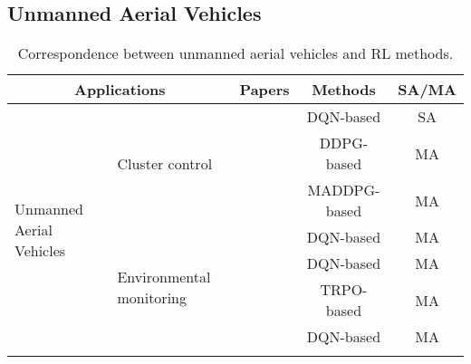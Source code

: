 \documentclass[acmsmall]{acmart}
\begin{document}
\subsection{Unmanned Aerial Vehicles}
\begin{table}[]
\centering
\caption{Correspondence between unmanned aerial vehicles and RL methods.}
\label{uav}
\begin{tabularx}{\textwidth}{|XX|c|c|c|}
\hline
\multicolumn{2}{|c|}{Applications}                                                                                & Papers                                                           & Methods                    & SA/MA \\ \hline
\multicolumn{1}{|X|}{\multirow{9}{=}{\centering Unmanned Aerial Vehicles}} & \multirow{3}{=}{\centering Cluster control}                & \cite{maciel2019online}                                          & DQN-based \cite{dqn}       & SA       \\ \cline{3-5} 
\multicolumn{1}{|X|}{}                                          &                                                 & \cite{9001167}                                                   & DDPG-based \cite{ddpg}     & MA       \\ \cline{3-5} 
\multicolumn{1}{|X|}{}                                          &                                                 & \cite{9209079}                                                   & MADDPG-based \cite{maddpg} & MA       \\ \cline{2-5} 
\multicolumn{1}{|X|}{}                                          & \multirow{4}{=}{\centering Environmental   monitoring}     & \cite{journals/corr/abs-1803-07250}                              & DQN-based \cite{dqn}       & MA       \\ \cline{3-5} 
\multicolumn{1}{|X|}{}                                          &                                                 & \cite{julian2019distributed}                                     & DQN-based \cite{dqn}       & MA       \\ \cline{3-5} 
\multicolumn{1}{|X|}{}                                          &                                                 & \cite{9172262}                                                   & TRPO-based \cite{trpo}     & MA       \\ \cline{3-5} 
\multicolumn{1}{|X|}{}                                          &                                                 & \cite{9453825}                                                   & DQN-based \cite{dqn}       & MA       \\ \cline{2-5} 

\end{tabularx}
\end{table}
\end{document}
